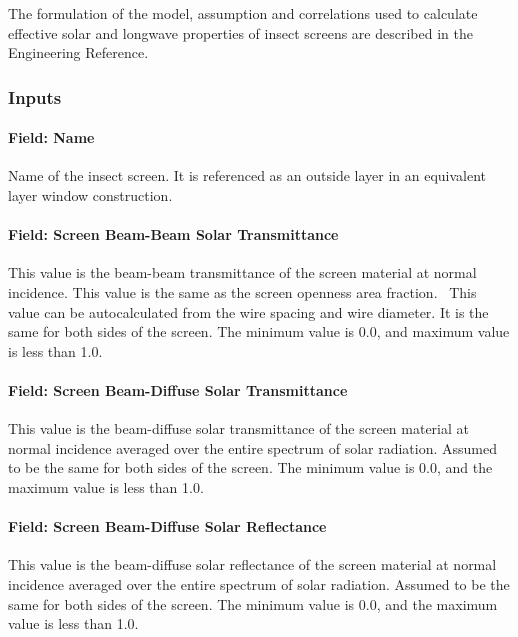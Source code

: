 The formulation of the model, assumption and correlations used to calculate effective solar and longwave properties of insect screens are described in the Engineering Reference.

\subsubsection{Inputs}\label{inputs-29-001}

\paragraph{Field: Name}\label{field-name-23-003}

Name of the insect screen. It is referenced as an outside layer in an equivalent layer window construction.

\paragraph{Field: Screen Beam-Beam Solar Transmittance}\label{field-screen-beam-beam-solar-transmittance}

This value is the beam-beam transmittance of the screen material at normal incidence. This value is the same as the screen openness area fraction.~ This value can be autocalculated from the wire spacing and wire diameter. It is the same for both sides of the screen. The minimum value is 0.0, and maximum value is less than 1.0.

\paragraph{Field: Screen Beam-Diffuse Solar Transmittance}\label{field-screen-beam-diffuse-solar-transmittance}

This value is the beam-diffuse solar transmittance of the screen material at normal incidence averaged over the entire spectrum of solar radiation. Assumed to be the same for both sides of the screen. The minimum value is 0.0, and the maximum value is less than 1.0.

\paragraph{Field: Screen Beam-Diffuse Solar Reflectance}\label{field-screen-beam-diffuse-solar-reflectance}

This value is the beam-diffuse solar reflectance of the screen material at normal incidence averaged over the entire spectrum of solar radiation. Assumed to be the same for both sides of the screen. The minimum value is 0.0, and the maximum value is less than 1.0.

